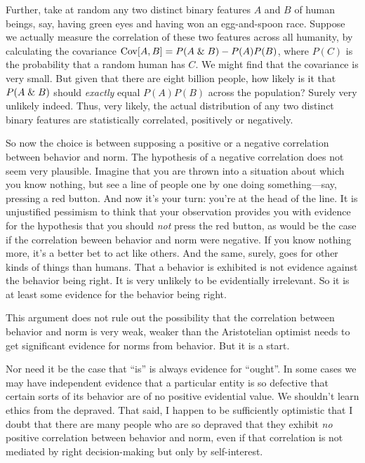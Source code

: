 Further, take at random any two distinct binary features $A$ and $B$ of human beings, say, 
having green eyes and having won an egg-and-spoon race. Suppose we actually measure the correlation of these two features 
across all humanity, by calculating the covariance $\operatorname{Cov}[A,B]=P(A\mathrel{\&} B)-P(A)P(B)$, where $P(C)$ is the probability that a random human has
$C$. We might find that the covariance is very small. But given that there are eight billion people, how likely is it that $P(A\mathrel{\&} B)$ should
\textit{exactly} equal $P(A)P(B)$ across the population? Surely very unlikely indeed. Thus, very likely, the actual
distribution of any two distinct binary features
are statistically correlated, positively or negatively.

So now the choice is between supposing a positive or a negative correlation between behavior and norm. The hypothesis of a negative 
correlation does not seem very plausible. Imagine that you are thrown into a situation about which you know nothing, but see a line of people
one by one doing something---say, pressing a red button. And now it's your turn: you're at the head of the line. 
It is unjustified pessimism to think that your 
observation provides you with evidence for the hypothesis that you should \textit{not} press the red button, as would 
be the case if the correlation beween behavior and norm were negative. If you know nothing more, it's a better bet to 
act like others. And the same, surely,
goes for other kinds of things than humans. That a behavior is exhibited is not evidence against the behavior being right. It is very unlikely
to be evidentially irrelevant. So it is at least some evidence for the behavior being right.

This argument does not rule out the possibility that the correlation between behavior and norm is very weak, weaker than the Aristotelian
optimist needs to get significant evidence for norms from behavior. But it is a start.

Nor need it be the case that ``is'' is always evidence for ``ought''. In some cases we may have independent evidence that a particular
entity is so defective that certain sorts of its behavior are of no positive evidential value. We shouldn't learn ethics from the 
depraved. That said, I happen to be sufficiently optimistic that I doubt that there are many people who are so depraved that they exhibit
\textit{no} positive correlation between behavior and norm, even if that correlation is not mediated by right decision-making but only
by self-interest.

